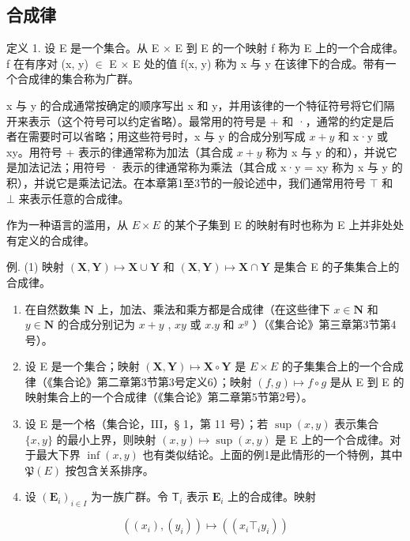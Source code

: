 \subsection{合成律}

定义 1. 设 E 是一个集合。从 E × E 到 E 的一个映射 f 称为 E 上的一个合成律。f 在有序对 (x, y) \ensuremath{\in} E × E 处的值 f(x, y) 称为 x 与 y 在该律下的合成。带有一个合成律的集合称为广群。

x 与 y 的合成通常按确定的顺序写出 x 和 y，并用该律的一个特征符号将它们隔开来表示（这个符号可以约定省略）。最常用的符号是 + 和 ·，通常的约定是后者在需要时可以省略；用这些符号时，x 与 y 的合成分别写成 \(x + y\) 和 x·y 或 xy。用符号 + 表示的律通常称为加法（其合成 \(x + y\) 称为 x 与 y 的和），并说它是加法记法；用符号 · 表示的律通常称为乘法（其合成 x·y = xy 称为 x 与 y 的积），并说它是乘法记法。在本章第1至3节的一般论述中，我们通常用符号 \(\top\) 和 \(\bot\) 来表示任意的合成律。

作为一种语言的滥用，从 \(E \times E\) 的某个子集到 E 的映射有时也称为 E 上并非处处有定义的合成律。

例. (1) 映射 \((\mathbf{X},\mathbf{Y})\mapsto \mathbf{X}\cup \mathbf{Y}\) 和 \((\mathbf{X},\mathbf{Y})\mapsto \mathbf{X}\cap \mathbf{Y}\) 是集合 E 的子集集合上的合成律。

\begin{enumerate}
\def\labelenumi{(\arabic{enumi})}
\setcounter{enumi}{1}
\item
  在自然数集 \(\mathbf{N}\) 上，加法、乘法和乘方都是合成律（在这些律下 \(x \in \mathbf{N}\) 和 \(y \in \mathbf{N}\) 的合成分别记为 \(x + y\) , \(xy\) 或 \(x.y\) 和 \(x^y\) ）（《集合论》第三章第3节第4号）。
\item
  设 E 是一个集合；映射 \((\mathbf{X}, \mathbf{Y}) \mapsto \mathbf{X} \circ \mathbf{Y}\) 是 \(E \times E\) 的子集集合上的一个合成律（《集合论》第二章第3节第3号定义6）；映射 \((f, g) \mapsto f \circ g\) 是从 E 到 E 的映射集合上的一个合成律（《集合论》第二章第5节第2号）。
\item
  设 E 是一个格（集合论，III，§ 1，第 11 号）；若 \(\sup(x, y)\) 表示集合 \(\{x, y\}\) 的最小上界，则映射 \((x, y) \mapsto \sup(x, y)\) 是 E 上的一个合成律。对于最大下界 \(\inf(x, y)\) 也有类似结论。上面的例1是此情形的一个特例，其中 \(\mathfrak{P}(E)\) 按包含关系排序。
\item
  设 \((\mathbf{E}_i)_{i\in I}\) 为一族广群。令 \(\mathsf{T}_i\) 表示 \(\mathbf{E}_i\) 上的合成律。映射
\end{enumerate}

\[
((x _ {i}), (y _ {i})) \mapsto ((x _ {i} \top_ {i} y _ {i}))
\]


